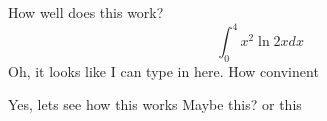 \documentclass{article}
\begin{document}
How well does this work?
$$\int_0^4 x^2 \ln{2x}dx$$
Oh, it looks like I can type in here. 
How convinent

Yes, lets see how this works Maybe this? or this
\end{document}
